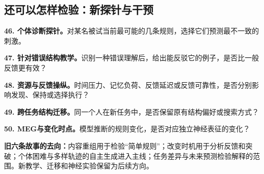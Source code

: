 \documentclass[12pt]{article}
\newcommand{\idea}[2]{\par\Needspace{3\baselineskip}\noindent\textbf{#1。}#2\par}
\begin{document}
\subsection{还可以怎样检验：新探针与干预}
\label{sec:new-experiments}
\idea{46. 个体诊断探针}{对某名被试当前最可能的几条规则，选择它们预测最不一致的刺激。}
\idea{47. 针对错误结构教学}{识别一种错误理解后，给出能反驳它的例子，是否比一般反馈更有效？}
\idea{48. 资源与反馈操纵}{时间压力、记忆负荷、反馈延迟或反馈可靠性，是否分别影响发现、保持或选择执行？}
\idea{49. 跨任务结构迁移}{同一个人在新任务中，是否保留原有结构偏好或搜索方式？}
\idea{50. MEG与变化时点}{模型推断的规则变化，是否对应独立神经表征的变化？}

\noindent\textbf{旧六条故事的去向：}内容重组用于检验“简单规则”；改变时机用于分析反馈和突破；个体困难与多样轨迹的自主生成进入主线；任务差异与未来预测检验解释的范围。新教学、迁移和神经实验保留为后续方向。
\endgroup
\end{document}

